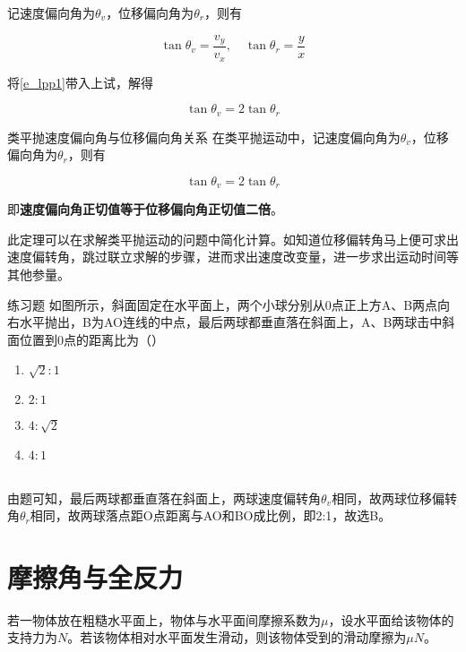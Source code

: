 记速度偏向角为$\theta_v$，位移偏向角为$\theta_r$，则有



$$\tan{\theta_v} = \frac{v_y}{v_x} ,\quad \tan{\theta_r} = \frac{y}{x}$$

将\eqref{e_lpp1}带入上试，解得

$$\tan{\theta_v} = 2 \tan{\theta_r}$$

\begin{theo}{类平抛速度偏向角与位移偏向角关系}{}
在类平抛运动中，记速度偏向角为$\theta_v$，位移偏向角为$\theta_r$，则有

$$\tan{\theta_v} = 2 \tan{\theta_r}$$

即\textbf{速度偏向角正切值等于位移偏向角正切值二倍}。
\end{theo}

此定理可以在求解类平抛运动的问题中简化计算。如知道位移偏转角马上便可求出速度偏转角，跳过联立求解的步骤，进而求出速度改变量，进一步求出运动时间等其他参量。

\begin{ep}{练习题}{}
如图所示，斜面固定在水平面上，两个小球分别从0点正上方A、B两点向右水平抛出，B为AO连线的中点，最后两球都垂直落在斜面上，A、B两球击中斜面位置到0点的距离比为（）

\begin{minipage}[b]{0.6\linewidth}
\begin{enumerate}[label=(\Alph*)]
  \item $\sqrt{2}:1$
  \item $2:1$
  \item $4:\sqrt{2}$
  \item $4:1$
\end{enumerate}
\end{minipage}
\hfill
\begin{minipage}[b]{0.3\linewidth}

\end{minipage}
~\\

由题可知，最后两球都垂直落在斜面上，两球速度偏转角$\theta_v$相同，故两球位移偏转角$\theta_r$相同，故两球落点距O点距离与AO和BO成比例，即2:1，故选B。
\end{ep}

\section{摩擦角与全反力}

若一物体放在粗糙水平面上，物体与水平面间摩擦系数为$\mu$，设水平面给该物体的支持力为$N$。若该物体相对水平面发生滑动，则该物体受到的滑动摩擦为$\mu N$。

